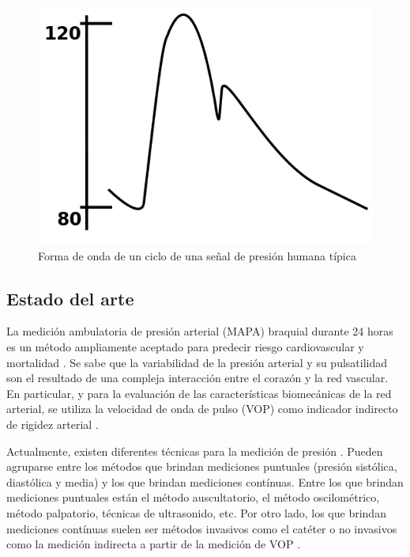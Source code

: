 \begin{figure}[!htbp]
	\centering
	\includegraphics[width=\textwidth]{./Figures/periodopresion.png}
	\caption{Forma de onda de un ciclo de una señal de presión humana típica}
	\label{fig:periodopresion}
\end{figure}


\subsection{Estado del arte}

La medición ambulatoria de presión arterial (MAPA) braquial durante 24 horas es un método ampliamente aceptado para predecir riesgo cardiovascular y mortalidad\citep{hansen2006} \citep{staensen1999} \citep{verdecchia1993}. Se sabe que la variabilidad de la presión arterial y su pulsatilidad son el resultado de una compleja interacción entre el corazón y la red vascular. En particular, y para la evaluación de las características biomecánicas de la red arterial, se utiliza la velocidad de onda de pulso (VOP) como indicador indirecto de rigidez arterial \citep{nichols2008}.

Actualmente, existen diferentes técnicas para la medición de presión \citep{ogedegbe2010}. Pueden agruparse entre los métodos que brindan mediciones puntuales (presión sistólica, diastólica y media) y los que brindan mediciones contínuas. Entre los que brindan mediciones puntuales están el método auscultatorio, el método oscilométrico, método palpatorio, técnicas de ultrasonido, etc. Por otro lado, los que brindan mediciones contínuas suelen ser métodos invasivos como el catéter o no invasivos como la medición indirecta a partir de la medición de VOP \citep{ruso2001}.

